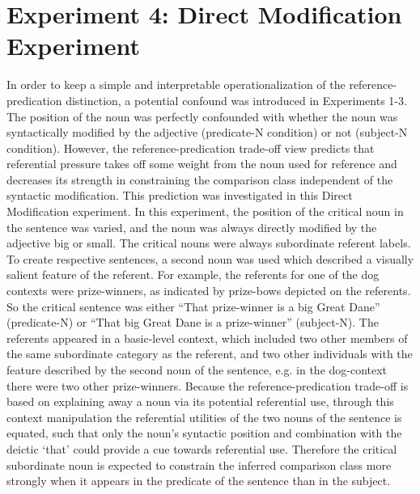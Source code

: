 \section{Experiment 4: Direct Modification Experiment} 
In order to keep a simple and interpretable operationalization of the reference-predication distinction, a potential confound was introduced in Experiments 1-3. The position of the noun was perfectly confounded with whether the noun was syntactically modified by the adjective (predicate-N condition) or not (subject-N condition). However, the reference-predication trade-off view predicts that referential pressure takes off some weight from the noun used for reference and decreases its strength in constraining the comparison class independent of the syntactic modification.  This prediction was investigated in this Direct Modification experiment.
In this experiment, the position of the critical noun in the sentence was varied, and the noun was always directly modified by the adjective big or small. The critical nouns were always subordinate referent labels. To create respective sentences, a second noun was used which described a visually salient feature of the referent. For example, the referents for one of the dog contexts were prize-winners, as indicated by prize-bows depicted on the referents. So the critical sentence was either “That prize-winner is a big Great Dane” (predicate-N) or “That big Great Dane is a prize-winner” (subject-N). 
The referents appeared in a basic-level context, which included two other members of the same subordinate category as the referent, and two other individuals with the feature described by the second noun of the sentence, e.g. in the dog-context there were two other prize-winners. Because the reference-predication trade-off is based on explaining away a noun via its potential referential use, through this context manipulation the referential utilities of the two nouns of the sentence is equated, such that only the noun’s syntactic position and combination with the deictic ‘that’ could provide a cue towards referential use. Therefore the critical subordinate noun is expected to constrain the inferred comparison class more strongly when it appears in the predicate of the sentence than in the subject.   
